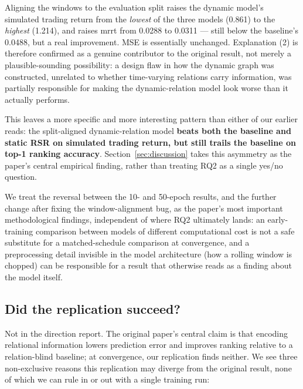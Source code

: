 \documentclass[12pt]{article}
\begin{document}
Aligning the windows to the evaluation split raises the dynamic model's simulated trading return
from the \emph{lowest} of the three models (0.861) to the \emph{highest} (1.214), and raises mrrt
from 0.0288 to 0.0311 --- still below the baseline's 0.0488, but a real improvement. MSE is
essentially unchanged. Explanation (2) is therefore confirmed as a genuine contributor to the
original result, not merely a plausible-sounding possibility: a design flaw in how the dynamic
graph was constructed, unrelated to whether time-varying relations carry information, was
partially responsible for making the dynamic-relation model look worse than it actually performs.

This leaves a more specific and more interesting pattern than either of our earlier reads: the
split-aligned dynamic-relation model \textbf{beats both the baseline and static RSR on simulated
trading return, but still trails the baseline on top-1 ranking accuracy}. Section~\ref{sec:discussion}
takes this asymmetry as the paper's central empirical finding, rather than treating RQ2 as a single
yes/no question.

We treat the reversal between the 10- and 50-epoch results, and the further change after fixing
the window-alignment bug, as the paper's most important methodological findings, independent of
where RQ2 ultimately lands: an early-training comparison between models of different
computational cost is not a safe substitute for a matched-schedule comparison at convergence, and
a preprocessing detail invisible in the model architecture (how a rolling window is chopped) can
be responsible for a result that otherwise reads as a finding about the model itself.

\subsection{Did the replication succeed?}

Not in the direction \citet{feng2019temporal} report. The original paper's central claim is that
encoding relational information lowers prediction error and improves ranking relative to a
relation-blind baseline; at convergence, our replication finds neither. We see three
non-exclusive reasons this replication may diverge from the original result, none of which we
can rule in or out with a single training run:
\end{document}
